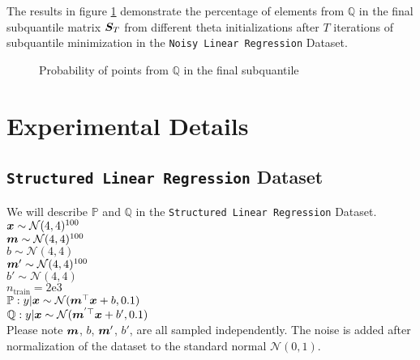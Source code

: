 \documentclass{article} %
\begin{document}
\begin{appendices}
		The results in figure \ref{fig:structure-subquantile} demonstrate the percentage of elements from $\mathbb{Q}$ in the final subquantile matrix ${\bm{S}}_T$ from different theta initializations after $T$ iterations of subquantile minimization in the \texttt{Noisy Linear Regression} Dataset. 
	
	\begin{figure}
		\begin{center}
			
		\end{center}
		\caption{Probability of points from $\mathbb{Q}$ in the final subquantile}
		\label{fig:structure-subquantile}
	\end{figure}
	
	\newpage
	\section{Experimental Details}\label{app:experimental-details}
	
	\subsection{\texttt{Structured Linear Regression} Dataset}
	We will describe $\mathbb{P}$ and $\mathbb{Q}$ in the \texttt{Structured Linear Regression} Dataset.\\
	${\bm{x}} \sim \mathcal{N}(4,4)^{100}$\\
	${\bm{m}} \sim \mathcal{N}(4,4)^{100}$\\
	$b \sim \mathcal{N}(4,4)$\\
	${\bm{m}}' \sim \mathcal{N}(4,4)^{100}$\\
	$b' \sim \mathcal{N}(4,4)$\\
	$n_{\text{train}} = 2\text{e}3$\\
	$\mathbb{P}: y|{\bm{x}} \sim \mathcal{N}({\bm{m}}^\top{\bm{x}} + b, 0.1)$\\
	$\mathbb{Q}: y|{\bm{x}} \sim \mathcal{N}({\bm{m}}^{'\top}{\bm{x}} + b', 0.1)$\\
	Please note ${\bm{m}}$, $b$, ${\bm{m}}'$, $b'$, are all sampled independently. The noise is added after normalization of the dataset to the standard normal $\mathcal{N}(0,1)$. 
	

\end{appendices}
\end{document}
